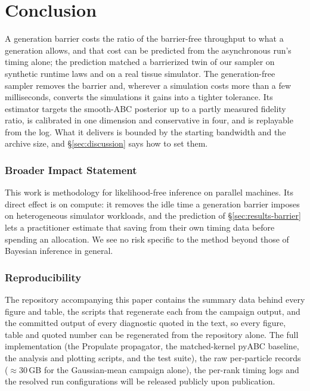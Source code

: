 \documentclass[10pt]{article}
\theoremstyle{plain}
\theoremstyle{definition}
\begin{document}
\section{Conclusion}\label{sec:conclusion}
A generation barrier costs the ratio of the barrier-free throughput to what a generation allows, and that cost can be predicted from the asynchronous run's timing alone; the prediction matched a barrierized twin of our sampler on synthetic runtime laws and on a real tissue simulator. The generation-free sampler removes the barrier and, wherever a simulation costs more than a few milliseconds, converts the simulations it gains into a tighter tolerance. Its estimator targets the smooth-ABC posterior up to a partly measured fidelity ratio, is calibrated in one dimension and conservative in four, and is replayable from the log. What it delivers is bounded by the starting bandwidth and the archive size, and \S\ref{sec:discussion} says how to set them.

\subsubsection*{Broader Impact Statement}
This work is methodology for likelihood-free inference on parallel machines. Its direct effect is on compute: it removes the idle time a generation barrier imposes on heterogeneous simulator workloads, and the prediction of \S\ref{sec:results-barrier} lets a practitioner estimate that saving from their own timing data before spending an allocation. We see no risk specific to the method beyond those of Bayesian inference in general.

\subsubsection*{Reproducibility}
The repository accompanying this paper contains the summary data behind every figure and table, the scripts that regenerate each from the campaign output, and the committed output of every diagnostic quoted in the text, so every figure, table and quoted number can be regenerated from the repository alone. The full implementation (the Propulate propagator, the matched-kernel pyABC baseline, the analysis and plotting scripts, and the test suite), the raw per-particle records (${\approx}30$\,GB for the Gaussian-mean campaign alone), the per-rank timing logs and the resolved run configurations will be released publicly upon publication.

\end{document}

